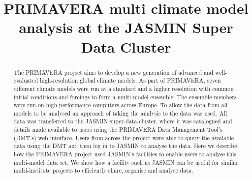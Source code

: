 \documentclass[gmd, manuscript]{copernicus}
\begin{document}
\title{PRIMAVERA multi climate model analysis at the JASMIN Super Data Cluster}













\received{}
\pubdiscuss{} %
\revised{}
\accepted{}
\published{}




\maketitle



\begin{abstract}
The PRIMAVERA project aims to develop a new generation of advanced and well-evaluated high-resolution global climate models. As part of PRIMAVERA, seven different climate models were run at a standard and a higher resolution with common initial conditions and forcings to form a multi-model ensemble. The ensemble members were run on high performance computers across Europe. To allow the data from all models to be analysed an approach of taking the analysis to the data was used. All data was transferred to the JASMIN super-data-cluster, where it was catalogued and details made available to users using the PRIMAVERA Data Management Tool's (DMT's) web interface. Users from across the project were able to query the available data using the DMT and then log in to JASMIN to analyse the data. Here we describe how the PRIMAVERA project used JASMIN's facilities to enable users to analyse this multi-model data set. We show how a facility such as JASMIN can be useful for similar multi-institute projects to efficiently share, organise and analyse data.
\end{abstract}
\end{document}
